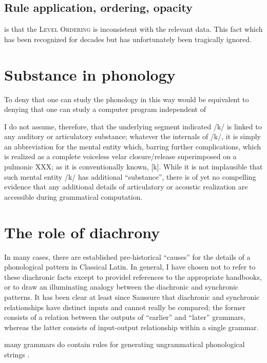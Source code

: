 \subsection{Rule application, ordering, opacity}

is that the
\textsc{Level Ordering} \citep{Siegel1974} is inconsistent with the relevant data. This fact which has been recognized for decades \citep{Aronoff1976} but has unfortunately been tragically ignored.

\section{Substance in phonology}

To deny that one can study the phonology in this way would be equivalent to denying that one can study a computer program independent of

I do not assume, therefore, that the underlying segment indicated /k/ is linked to any auditory or articulatory substance; whatever the internals of /k/, it is simply an abbreviation for the mental entity which, barring further complications, which is realized as a complete voiceless velar closure/release superimposed on a pulmonic XXX; as it is conventionally known, [k].
While it is not implausible that such mental entity /k/ has additional ``substance'', there is of yet no compelling evidence that any additional details of articulatory or acoustic realization are accessible during grammatical computation.


\section{The role of diachrony}

In many cases, there are established pre-historical ``causes'' for the details of a phonological pattern in Classical Latin.
In general, I have chosen not to refer to these diachronic facts except to providel references to the appropriate handbooks, or to draw an illuminating analogy between the diachronic and synchronic patterns.
It has been clear at least since Saussure that diachronic and synchronic relationships have distinct inputs and cannot really be compared; the former consists of a relation between the outputs of ``earlier'' and ``later'' grammars, whereas the latter consists of input-output relationship within a single grammar.

many grammars do contain rules for generating ungrammatical phonological strings \citep[19]{Bauer2001}.
